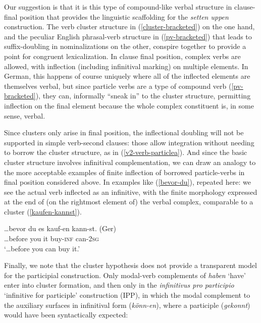 \documentclass[output=paper]{langscibook}
\begin{document}
Our suggestion is that it is this type of compound-like verbal structure in clause-final position that provides the linguistic scaffolding for the \textit{setten uppen} construction. The verb cluster structure in (\ref{cluster-bracketed}) on the one hand, and the peculiar English phrasal-verb structure in (\ref{pv-bracketed}) that leads to suffix-doubling in nominalizations on the other, conspire together to provide a point for congruent lexicalization. In clause final position, complex verbs are allowed, with inflection (including infinitival marking) on multiple elements. In German, this happens of course uniquely where all of the inflected elements are themselves verbal, but since particle verbs are a type of compound verb (\ref{pv-bracketed}), they can, informally ``sneak in'' to the cluster structure, permitting inflection on the final element because the whole complex constituent is, in some sense, verbal. 

Since clusters only arise in final position, the inflectional doubling will not be supported in simple verb-second clauses: those allow integration without needing to borrow the cluster structure, as in (\ref{v2-verb-particlea}). And since the basic cluster structure involves infinitival complementation, we can draw an analogy to the more acceptable examples of finite inflection of borrowed particle-verbs in final position considered above. In examples like (\ref{bevor-du}), repeated here: we see the actual verb inflected as an infinitive, with the finite morphology expressed at the end of (on the rightmost element of) the verbal complex, comparable to a cluster (\ref{kaufen-kannst}).

\ea
{} 
\z\z 
\ea\gll \label{kaufen-kannst}\ldots bevor du es kauf-en kann-st. (Ger)\\
\ldots before you it buy-\textsc{inf} can-\textsc{2sg}\\
\glt `\ldots before you can buy it.'
\z 

Finally, we note that the cluster hypothesis does not provide a transparent model for the participial construction. Only modal-verb complements of \textit{haben} `have' enter into cluster formation, and then only in the \textit{infinitivus pro participio} ‘infinitive for participle’ construction (IPP), in which the modal complement to the auxiliary surfaces in infinitival form (\textit{könn-en}), where a participle (\textit{gekonnt}) would have been syntactically expected:
\end{document}
